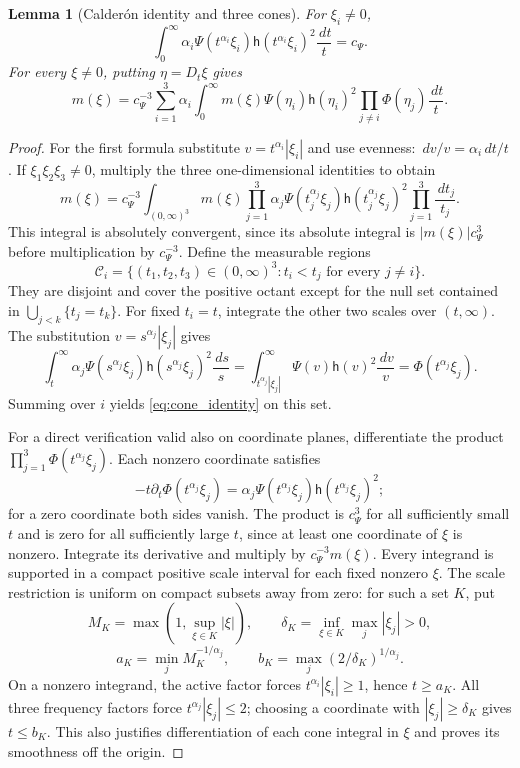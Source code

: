 \documentclass[12pt,reqno]{amsart}
\theoremstyle{plain}
\newtheorem{lemma}[theorem]{Lemma}
\theoremstyle{definition}
\theoremstyle{remark}
\numberwithin{equation}{section}
\newcommand{\h}{\mathsf h}
\newcommand{\dd}{\,d}
\begin{document}
\begin{lemma}[Calder\'on identity and three cones]\label{lem:calderon}
For $\xi_i\ne0$,
\[
 \int_0^\infty\alpha_i\Psi(t^{\alpha_i}\xi_i)
                 \h(t^{\alpha_i}\xi_i)^2\frac{\dd t}{t}=c_\Psi.
\]
For every $\xi\ne0$, putting $\eta=D_t\xi$ gives
\begin{equation}\label{eq:cone_identity}
 m(\xi)=c_\Psi^{-3}\sum_{i=1}^3\alpha_i
     \int_0^\infty m(\xi)\Psi(\eta_i)\h(\eta_i)^2
                          \prod_{j\ne i}\Phi(\eta_j)\frac{\dd t}{t}.
\end{equation}
\end{lemma}
\begin{proof}
For the first formula substitute $v=t^{\alpha_i}|\xi_i|$ and use
evenness: $\dd v/v=\alpha_i\dd t/t$.
If $\xi_1\xi_2\xi_3\ne0$, multiply the three one-dimensional
identities to obtain
\[
 m(\xi)=c_\Psi^{-3}\int_{(0,\infty)^3}m(\xi)
      \prod_{j=1}^3\alpha_j\Psi(t_j^{\alpha_j}\xi_j)
                                  \h(t_j^{\alpha_j}\xi_j)^2
                          \prod_{j=1}^3\frac{\dd t_j}{t_j}.
\]
This integral is absolutely convergent, since its absolute integral
is $|m(\xi)|c_\Psi^3$ before multiplication by $c_\Psi^{-3}$.
Define the measurable regions
\[
 \mathcal C_i=\{(t_1,t_2,t_3)\in(0,\infty)^3:
                      t_i<t_j\text{ for every }j\ne i\}.
\]
They are disjoint and cover the positive octant except for the null
set contained in $\bigcup_{j<k}\{t_j=t_k\}$.
For fixed $t_i=t$, integrate the other two scales over $(t,\infty)$.
The substitution $v=s^{\alpha_j}|\xi_j|$ gives
\[
 \int_t^\infty\alpha_j\Psi(s^{\alpha_j}\xi_j)
           \h(s^{\alpha_j}\xi_j)^2\frac{\dd s}{s}
       =\int_{t^{\alpha_j}|\xi_j|}^\infty
                \Psi(v)\h(v)^2\frac{\dd v}{v}
       =\Phi(t^{\alpha_j}\xi_j).
\]
Summing over $i$ yields \eqref{eq:cone_identity} on this set.

For a direct verification valid also on coordinate planes,
differentiate the product $\prod_{j=1}^3\Phi(t^{\alpha_j}\xi_j)$.
Each nonzero coordinate satisfies
\[
 -t\partial_t\Phi(t^{\alpha_j}\xi_j)
       =\alpha_j\Psi(t^{\alpha_j}\xi_j)\h(t^{\alpha_j}\xi_j)^2;
\]
for a zero coordinate both sides vanish. The product is $c_\Psi^3$
for all sufficiently small $t$ and is zero for all sufficiently
large $t$, since at least one coordinate of $\xi$ is nonzero.
Integrate its derivative and multiply by $c_\Psi^{-3}m(\xi)$.
Every integrand is supported in a compact positive scale interval
for each fixed nonzero $\xi$.
The scale restriction is uniform on compact subsets away from zero:
for such a set $K$, put
\[
 M_K=\max(1,\sup_{\xi\in K}|\xi|),\qquad
 \delta_K=\inf_{\xi\in K}\max_j|\xi_j|>0,
\]
\[
 a_K=\min_j M_K^{-1/\alpha_j},\qquad
 b_K=\max_j(2/\delta_K)^{1/\alpha_j}.
\]
On a nonzero integrand, the active factor forces
$t^{\alpha_i}|\xi_i|\ge1$, hence $t\ge a_K$.
All three frequency factors force $t^{\alpha_j}|\xi_j|\le2$;
choosing a coordinate with $|\xi_j|\ge\delta_K$ gives $t\le b_K$.
This also justifies differentiation of each cone integral in $\xi$
and proves its smoothness off the origin.
\end{proof}
\end{document}
